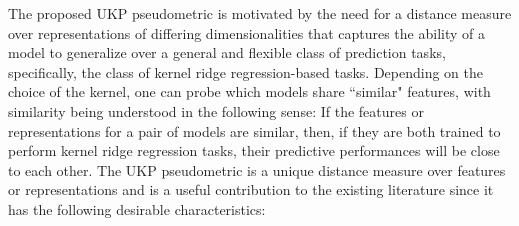 \documentclass{article} %
\newcommand{\metricstname}{UKP }
\theoremstyle{plain}
\begin{document}
 The proposed \metricstname pseudometric is motivated by the need for a distance measure over representations of differing 
 dimensionalities that captures the ability of a model to generalize over a general and flexible class of prediction tasks, specifically, the class of kernel ridge regression-based tasks. Depending on the choice of the kernel, one can probe which models share ``similar" features, with similarity being understood in the following sense: If the features or representations for a pair of models are similar, then, if they are both trained to perform kernel ridge regression tasks, their predictive performances will be close to each other.
 The \metricstname pseudometric is a unique distance measure over features or representations and is a useful contribution to the existing literature since it has the following desirable characteristics:
\end{document}
